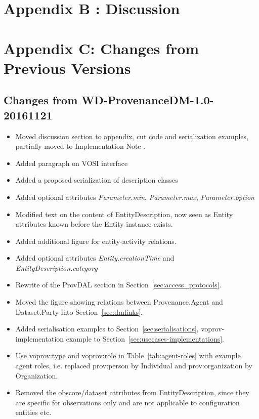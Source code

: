 \documentclass[11pt,a4paper]{ivoa}
\begin{document}
\section{Appendix B : Discussion}
\label{sec:discussions}


\section{Appendix C: Changes from Previous Versions}
\subsection{Changes from WD-ProvenanceDM-1.0-20161121}
\begin{itemize}
\item Moved discussion section to appendix, cut code and serialization examples, partially moved to Implementation Note \citep{std:ProvenanceImplementationNote}.
\item Added paragraph on VOSI interface
\item Added a proposed serialization of description classes
\item Added optional attributes \emph{Parameter.min},  \emph{Parameter.max},  \emph{Parameter.option}
\item Modified text on the content of EntityDescription, now seen as Entity attributes known before the Entity instance exists.
\item Added additional figure for entity-activity relations.
\item Added optional attributes \emph{Entity.creationTime} and \emph{EntityDescription.category}
\item Rewrite of the ProvDAL section in Section~\ref{sec:access_protocols}.
\item Moved the figure showing relations between Provenance.Agent and Dataset.Party into Section~\ref{sec:dmlinks}.
\item Added serialisation examples to Section~\ref{sec:serialisations}, voprov-implementation example to Section~\ref{sec:usecases-implementations}.
\item Use voprov:type and voprov:role in Table~\ref{tab:agent-roles} with example agent roles, i.e. replaced prov:person by Individual and prov:organization by Organization.
\item Removed the obscore/dataset attributes from EntityDescription, since they are specific for observations only and are not applicable to configuration entities etc.

\end{itemize}
\end{document}
